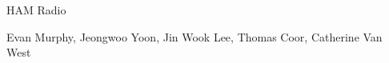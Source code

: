 \documentclass[12pt]{minimal}
\begin{document}
HAM Radio

Evan Murphy, Jeongwoo Yoon, Jin Wook Lee, Thomas Coor, Catherine Van West
\end{document}
